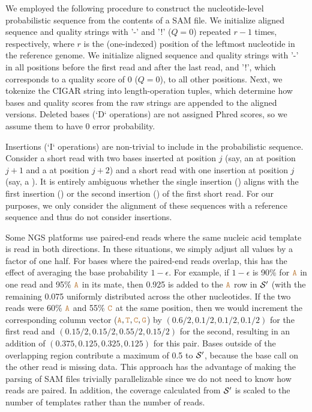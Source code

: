 \documentclass[10pt]{article}
\begin{document}
We employed the following procedure to construct the nucleotide-level probabilistic sequence from the contents of a SAM file.
We initialize aligned sequence and quality strings with '-' and '!' ($Q=0$) repeated $r-1$ times, respectively, where $r$ is the (one-indexed) position of the leftmost nucleotide in the reference genome.
We initialize aligned sequence and quality strings with '-' in all positions before the first read and after the last read, and '!', which corresponds to a quality score of 0 ($Q=0$), to all other positions.
Next, we tokenize the CIGAR string into length-operation tuples, which determine how bases and quality scores from the raw strings are appended to the aligned versions.
Deleted bases (`D` operations) are not assigned Phred scores, so we assume them to have 0 error probability.

Insertions (`I` operations) are non-trivial to include in the probabilistic sequence.
Consider a short read with two bases inserted at position $j$ (say, an  at position $j+1$ and a  at position $j+2$) and a short read with one insertion at position $j$ (say, a ).
It is entirely ambiguous whether the single insertion () aligns with the first insertion () or the second insertion () of the first short read. 
For our purposes, we only consider the alignment of these sequences with a reference sequence and thus do not consider insertions.

Some NGS platforms use paired-end reads where the same nucleic acid template is read in both directions.
In these situations, we simply adjust all values by a factor of one half.
For bases where the paired-end reads overlap, this has the effect of averaging the base probability $1-\epsilon$.
For example, if $1-\epsilon$ is 90\% for $\texttt{\textcolor{brown}{A}}$ in one read and 95\% $\texttt{\textcolor{brown}{A}}$ in its mate, then 0.925 is added to the $\texttt{\textcolor{brown}{A}}$ row in $\mathcal{S}'$ (with the remaining 0.075 uniformly distributed across the other nucleotides.
If the two reads were 60\% $\texttt{\textcolor{brown}{A}}$ and 55\% $\texttt{\textcolor{brown}{C}}$ at the same position, then we would increment the corresponding column vector ($\texttt{\textcolor{brown}{A}}, \texttt{\textcolor{brown}{T}}, \texttt{\textcolor{brown}{C}}, \texttt{\textcolor{brown}{G}}$) by $(0.6/2, 0.1/2, 0.1/2, 0.1/2)$ for the first read and $(0.15/2, 0.15/2, 0.55/2, 0.15/2)$ for the second, resulting in an addition of $(0.375, 0.125, 0.325, 0.125)$ for this pair.
Bases outside of the overlapping region contribute a maximum of 0.5 to $\mathcal{S}'$, because the base call on the other read is missing data.
This approach has the advantage of making the parsing of SAM files trivially parallelizable since we do not need to know how reads are paired.
In addition, the coverage calculated from $\mathcal{S}'$ is scaled to the number of templates rather than the number of reads.
\end{document}
